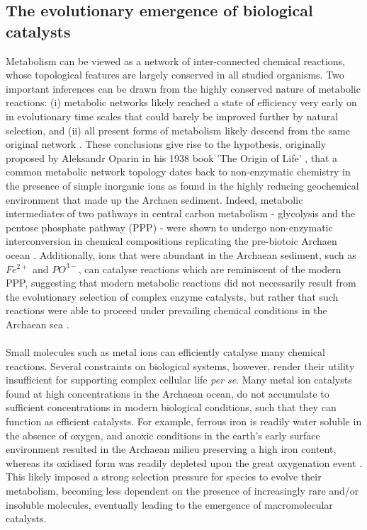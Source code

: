 \subsection{The evolutionary emergence of biological catalysts}
Metabolism can be viewed as a network of inter-connected chemical reactions, whose topological features are largely conserved in all studied organisms. Two important inferences can be drawn from the highly conserved nature of metabolic reactions: (i) metabolic networks likely reached a state of efficiency very early on in evolutionary time scales that could barely be improved further by natural selection, and (ii) all present forms of metabolism likely descend from the same original network \cite{Jeong:2000aa}. These conclusions give rise to the hypothesis, originally proposed by Aleksandr Oparin in his 1938 book 'The Origin of Life' \cite{oparin1965origin}, that a common metabolic network topology dates back to non-enzymatic chemistry in the presence of simple inorganic ions as found in the highly reducing geochemical environment that made up the Archaen sediment. Indeed, metabolic intermediates of two pathways in central carbon metabolism - glycolysis and the pentose phosphate pathway (PPP) - were shown to undergo non-enzymatic interconversion in chemical compositions replicating the pre-biotoic Archaen ocean \cite{Keller:2014aa}. Additionally, ions that were abundant in the Archaean sediment, such as $Fe^{2+}$ and $PO^{3-}$, can catalyse reactions which are reminiscent of the modern PPP, suggesting that modern metabolic reactions did not necessarily result from the evolutionary selection of complex enzyme catalysts, but rather that such reactions were able to proceed under prevailing chemical conditions in the Archaean sea \cite{Ralser:2014aa}. 
%
%
\\\\
%
%
Small molecules such as metal ions can efficiently catalyse many chemical reactions. Several constraints on biological systems, however, render their utility insufficient for supporting complex cellular life \textit{per se}. Many metal ion catalysts found at high concentrations in the Archaean ocean, do not accumulate to sufficient concentrations in modern biological conditions, such that they can function as efficient catalysts. For example, ferrous iron is readily water soluble in the absence of oxygen, and anoxic conditions in the earth's early surface environment resulted in the Archaean milieu preserving a high iron content, whereas its oxidised form was readily depleted upon the great oxygenation event \cite{Konhauser:2011aa}. This likely imposed a strong selection pressure for species to evolve their metabolism, becoming less dependent on the presence of increasingly rare and/or insoluble molecules, eventually leading to the emergence of macromolecular catalysts. 
